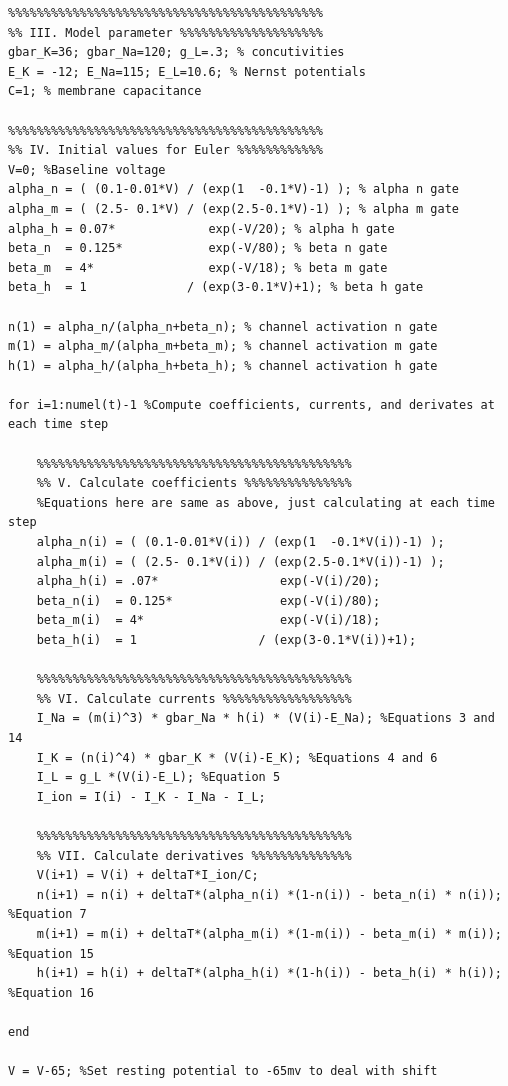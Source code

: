 \documentclass[12pt]{article}
\newenvironment{exercise}[2][Exercise]{\begin{trivlist}
\item[\hskip \labelsep {\bfseries #1}\hskip \labelsep {\bfseries #2.}]}{\end{trivlist}}
\begin{document}
\begin{exercise}{2.3}
\begin{enumerate}
\begin{tiny}
\begin{lstlisting}
%%%%%%%%%%%%%%%%%%%%%%%%%%%%%%%%%%%%%%%%%%%%
%% III. Model parameter %%%%%%%%%%%%%%%%%%%%
gbar_K=36; gbar_Na=120; g_L=.3; % concutivities
E_K = -12; E_Na=115; E_L=10.6; % Nernst potentials
C=1; % membrane capacitance

%%%%%%%%%%%%%%%%%%%%%%%%%%%%%%%%%%%%%%%%%%%%
%% IV. Initial values for Euler %%%%%%%%%%%%
V=0; %Baseline voltage
alpha_n = ( (0.1-0.01*V) / (exp(1  -0.1*V)-1) ); % alpha n gate
alpha_m = ( (2.5- 0.1*V) / (exp(2.5-0.1*V)-1) ); % alpha m gate
alpha_h = 0.07*             exp(-V/20); % alpha h gate
beta_n  = 0.125*            exp(-V/80); % beta n gate
beta_m  = 4*                exp(-V/18); % beta m gate
beta_h  = 1              / (exp(3-0.1*V)+1); % beta h gate

n(1) = alpha_n/(alpha_n+beta_n); % channel activation n gate
m(1) = alpha_m/(alpha_m+beta_m); % channel activation m gate
h(1) = alpha_h/(alpha_h+beta_h); % channel activation h gate

for i=1:numel(t)-1 %Compute coefficients, currents, and derivates at each time step
    
    %%%%%%%%%%%%%%%%%%%%%%%%%%%%%%%%%%%%%%%%%%%%
    %% V. Calculate coefficients %%%%%%%%%%%%%%%
    %Equations here are same as above, just calculating at each time step
    alpha_n(i) = ( (0.1-0.01*V(i)) / (exp(1  -0.1*V(i))-1) );
    alpha_m(i) = ( (2.5- 0.1*V(i)) / (exp(2.5-0.1*V(i))-1) );
    alpha_h(i) = .07*                 exp(-V(i)/20);
    beta_n(i)  = 0.125*               exp(-V(i)/80);
    beta_m(i)  = 4*                   exp(-V(i)/18);
    beta_h(i)  = 1                 / (exp(3-0.1*V(i))+1);
    
    %%%%%%%%%%%%%%%%%%%%%%%%%%%%%%%%%%%%%%%%%%%%
    %% VI. Calculate currents %%%%%%%%%%%%%%%%%%
    I_Na = (m(i)^3) * gbar_Na * h(i) * (V(i)-E_Na); %Equations 3 and 14
    I_K = (n(i)^4) * gbar_K * (V(i)-E_K); %Equations 4 and 6
    I_L = g_L *(V(i)-E_L); %Equation 5
    I_ion = I(i) - I_K - I_Na - I_L; 
    
    %%%%%%%%%%%%%%%%%%%%%%%%%%%%%%%%%%%%%%%%%%%%
    %% VII. Calculate derivatives %%%%%%%%%%%%%%
    V(i+1) = V(i) + deltaT*I_ion/C;
    n(i+1) = n(i) + deltaT*(alpha_n(i) *(1-n(i)) - beta_n(i) * n(i)); %Equation 7
    m(i+1) = m(i) + deltaT*(alpha_m(i) *(1-m(i)) - beta_m(i) * m(i)); %Equation 15
    h(i+1) = h(i) + deltaT*(alpha_h(i) *(1-h(i)) - beta_h(i) * h(i)); %Equation 16

end

V = V-65; %Set resting potential to -65mv to deal with shift


\end{lstlisting}
\end{tiny}
\end{enumerate}
\end{exercise}
\end{document}

